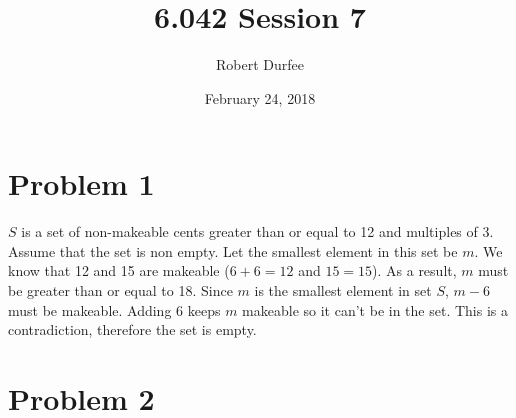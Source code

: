\documentclass{article}
\title{ 6.042 Session 7 }
\author{ Robert Durfee }
\date{ February 24, 2018 }
\begin{document}
\maketitle

\section*{Problem 1}

$S$ is a set of non-makeable cents greater than or equal to 12 and multiples of
3. Assume that the set is non empty. Let the smallest element in this set be
$m$. We know that 12 and 15 are makeable ($6 + 6 = 12$ and $15 = 15$). As a
result, $m$ must be greater than or equal to 18. Since $m$ is the smallest
element in set $S$, $m - 6$ must be makeable. Adding $6$ keeps $m$ makeable so
it can't be in the set. This is a contradiction, therefore the set is empty.

\section*{Problem 2}
\end{document}
